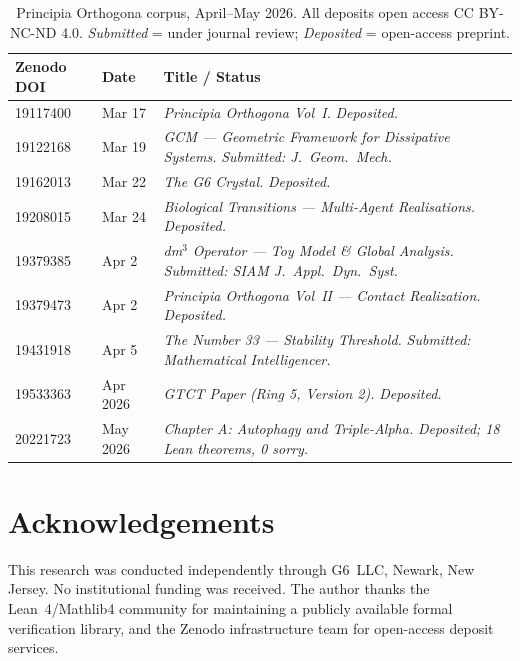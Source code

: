 \documentclass[12pt,a4paper]{article}
\begin{document}
\begin{table}[ht]
\centering
\small
\caption{Principia Orthogona corpus, April--May 2026.
All deposits open access CC BY-NC-ND 4.0.
\emph{Submitted} = under journal review;
\emph{Deposited} = open-access preprint.}
\label{tab:corpus}
\begin{tabularx}{\textwidth}{llX}
\toprule
Zenodo DOI & Date & Title / Status \\
\midrule
19117400 & Mar 17 &
  \textit{Principia Orthogona Vol~I.} \emph{Deposited.} \\
19122168 & Mar 19 &
  \textit{GCM --- Geometric Framework for Dissipative Systems.}
  \emph{Submitted: J.\ Geom.\ Mech.} \\
19162013 & Mar 22 &
  \textit{The G6 Crystal.} \emph{Deposited.} \\
19208015 & Mar 24 &
  \textit{Biological Transitions --- Multi-Agent Realisations.}
  \emph{Deposited.} \\
19379385 & Apr 2 &
  \textit{dm$^3$ Operator --- Toy Model \& Global Analysis.}
  \emph{Submitted: SIAM J.\ Appl.\ Dyn.\ Syst.} \\
19379473 & Apr 2 &
  \textit{Principia Orthogona Vol~II --- Contact Realization.}
  \emph{Deposited.} \\
19431918 & Apr 5 &
  \textit{The Number 33 --- Stability Threshold.}
  \emph{Submitted: Mathematical Intelligencer.} \\
19533363 & Apr 2026 &
  \textit{GTCT Paper (Ring 5, Version 2).} \emph{Deposited.} \\
20221723 & May 2026 &
  \textit{Chapter A: Autophagy and Triple-Alpha.}
  \emph{Deposited; 18 Lean theorems, 0 sorry.} \\
\bottomrule
\end{tabularx}
\end{table}

\section*{Acknowledgements}

This research was conducted independently through G6~LLC,
Newark, New Jersey.
No institutional funding was received.
The author thanks the Lean~4/Mathlib4 community for maintaining
a publicly available formal verification library, and the Zenodo
infrastructure team for open-access deposit services.
\end{document}
